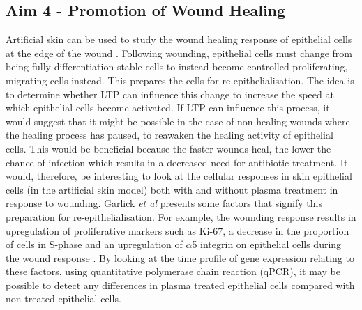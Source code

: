 \documentclass[11pt, oneside]{article}   	%
\begin{document}
\subsection*{Aim 4 - Promotion of Wound Healing}
Artificial skin can be used to study the wound healing response of epithelial cells at the edge of the wound \cite{Rasmussen2013classical, Garlick2007engineering}. Following wounding, epithelial cells must change from being fully differentiation stable cells to instead become controlled proliferating, migrating cells instead. This prepares the cells for re-epithelialisation.
The idea is to determine whether LTP can influence this change to increase the speed at which epithelial cells become activated. If LTP can influence this process, it would suggest that it might be possible in the case of non-healing wounds where the healing process has paused, to reawaken the healing activity of epithelial cells.
This would be beneficial because the faster wounds heal, the lower the chance of infection which results in a decreased need for antibiotic treatment.
It would, therefore, be interesting to look at the cellular responses in skin epithelial cells (in the artificial skin model) both with and without plasma treatment in response to wounding. Garlick \textit{et al} presents some factors that signify this preparation for re-epithelialisation. 
For example, the wounding response results in upregulation of proliferative markers such as Ki-67, a decrease in the proportion of cells in S-phase and an upregulation of $\alpha$5 integrin on epithelial cells during the wound response \cite{Garlick2007engineering}. By looking at the time profile of gene expression relating to these factors, using quantitative polymerase chain reaction (qPCR), it may be possible to detect any differences in plasma treated epithelial cells compared with non treated epithelial cells.





\end{document}
